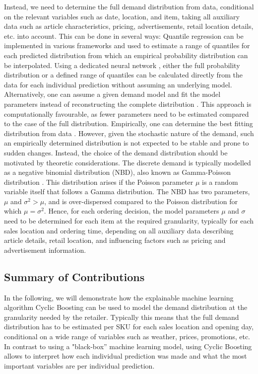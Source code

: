 \documentclass[BCOR=1mm, DIV=calc,10pt,
twoside=true,
twocolumn,
headings=normal]{scrartcl}
\begin{document}
Instead, we need to determine the full demand distribution from data, conditional on the relevant variables such as date, location, and item, taking all auxiliary data such as article characteristics, pricing, advertisements, retail location details, etc. into account. This can be done in several ways: Quantile regression \cite{koenker2001, wen2017} can be implemented in various frameworks and used to estimate a range of quantiles for each predicted distribution from which an empirical probability distribution can be interpolated. Using a dedicated neural network \cite{Feindt2006190}, either the  full probability distribution or a defined range of quantiles can be calculated directly from the data for each individual prediction without assuming an underlying model. Alternatively, one can assume a given demand model and fit the model parameters instead of reconstructing the complete distribution \cite{astonpr373, SALINAS20201181}. This approach is computationally favourable, as fewer parameters need to be estimated compared to the case of the full distribution. Empirically, one can determine the best fitting distribution from data \cite{adan1995}. However, given the stochastic nature of the demand, such an empirically determined distribution is not expected to be stable and prone to sudden changes. Instead, the choice of the demand distribution should be motivated by theoretic considerations. The discrete demand is typically modelled as a negative binomial distribution (NBD), also known as Gamma-Poisson distribution \cite{Ehrenberg1959,Ehrenberg1967,Ehrenberg1972,Chatfield1973,Schmittlein_1985}. This distribution arises if the Poisson parameter $\mu$ is a random variable itself that follows a Gamma distribution. The NBD has two parameters, $\mu$ and $ \sigma^2 > \mu$, and is over-dispersed compared to the Poisson distribution for which $\mu = \sigma^2$. Hence, for each ordering decision, the model parameters $\mu$ and $\sigma$ need to be determined for each item at the required granularity, typically for each sales location and ordering time, depending on all auxiliary data describing article details, retail location, and influencing factors such as pricing and advertisement information.

\subsection*{Summary of Contributions}

In the following, we will demonstrate how the explainable machine learning algorithm Cyclic Boosting \cite{Wick2019} can be used to model the demand distribution at the granularity needed by the retailer. Typically this means that the full demand distribution has to be estimated per SKU for each sales location and opening day, conditional on a wide range of variables such as weather, prices, promotions, etc. In contrast to using a "black-box'' machine learning model, using Cyclic Boosting allows to interpret how each individual prediction was made and what the most important variables are per individual prediction.
\end{document}
